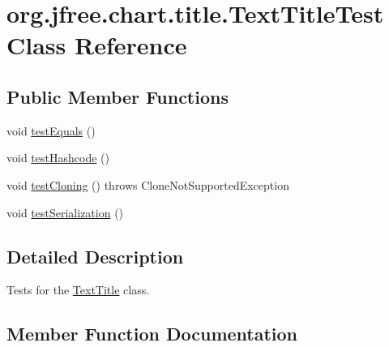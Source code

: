 \hypertarget{classorg_1_1jfree_1_1chart_1_1title_1_1_text_title_test}{}\section{org.\+jfree.\+chart.\+title.\+Text\+Title\+Test Class Reference}
\label{classorg_1_1jfree_1_1chart_1_1title_1_1_text_title_test}
\subsection*{Public Member Functions}
\begin{DoxyCompactItemize}
\item 
void \mbox{\hyperlink{classorg_1_1jfree_1_1chart_1_1title_1_1_text_title_test_a8d4063a0d5849bcffa45515cb8a53fe9}{test\+Equals}} ()
\item 
void \mbox{\hyperlink{classorg_1_1jfree_1_1chart_1_1title_1_1_text_title_test_a4aa214675bbdcadbacc35d354d11fb07}{test\+Hashcode}} ()
\item 
void \mbox{\hyperlink{classorg_1_1jfree_1_1chart_1_1title_1_1_text_title_test_a9ceb3907a023785a2c9d194f2efbff81}{test\+Cloning}} ()  throws Clone\+Not\+Supported\+Exception 
\item 
void \mbox{\hyperlink{classorg_1_1jfree_1_1chart_1_1title_1_1_text_title_test_a656b9599d8cdfb6493ebb623dba35311}{test\+Serialization}} ()
\end{DoxyCompactItemize}


\subsection{Detailed Description}
Tests for the \mbox{\hyperlink{classorg_1_1jfree_1_1chart_1_1title_1_1_text_title}{Text\+Title}} class. 

\subsection{Member Function Documentation}
\mbox{\label{classorg_1_1jfree_1_1chart_1_1title_1_1_text_title_test_a9ceb3907a023785a2c9d194f2efbff81}} 
